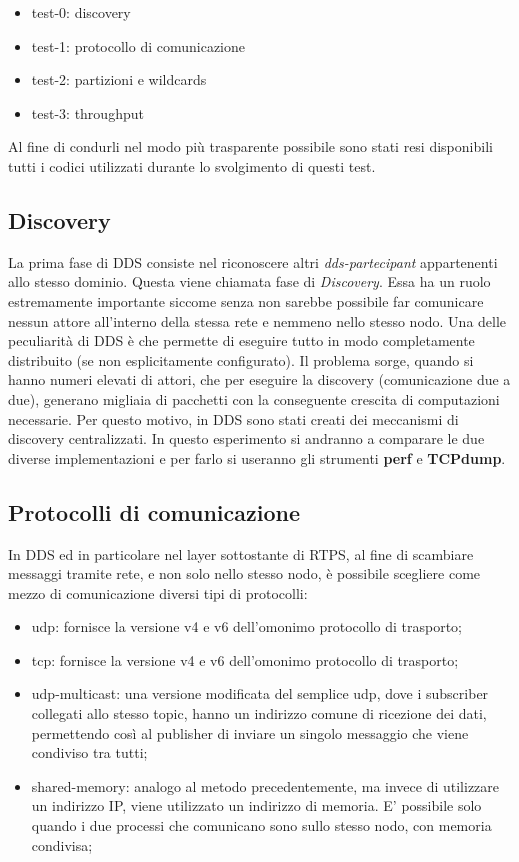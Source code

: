 \begin{itemize}
    \item test-0: discovery
    \item test-1: protocollo di comunicazione
    \item test-2: partizioni e wildcards
    \item test-3: throughput
\end{itemize}

Al fine di condurli nel modo più trasparente possibile sono stati resi disponibili~\cite{mygit} tutti i codici utilizzati durante lo svolgimento di questi test. %


\subsection{Discovery}
La prima fase di DDS consiste nel riconoscere altri \emph{dds-partecipant} appartenenti allo stesso dominio. Questa viene chiamata fase di \emph{ Discovery}. Essa ha un ruolo estremamente importante siccome senza non sarebbe possibile far comunicare nessun attore all'interno della stessa rete e nemmeno nello stesso nodo. Una delle peculiarità di DDS è che permette di eseguire tutto in modo completamente distribuito (se non esplicitamente configurato). Il problema sorge, quando si hanno numeri elevati di attori, che per eseguire la discovery (comunicazione due a due), generano migliaia di pacchetti con la conseguente crescita di  computazioni necessarie. %
Per questo motivo, in DDS sono stati creati dei meccanismi di discovery centralizzati. In questo esperimento si andranno a comparare le due diverse implementazioni e per farlo si useranno gli strumenti \textbf{perf} e \textbf{TCPdump}.

\subsection{Protocolli di comunicazione}
In DDS ed in particolare nel layer sottostante di RTPS, al fine di scambiare messaggi tramite rete, e non solo nello stesso nodo, è possibile scegliere come mezzo di comunicazione diversi tipi di protocolli:
\begin{itemize}
    \item udp: fornisce la versione v4 e v6 dell'omonimo protocollo di trasporto;
    \item tcp: fornisce la versione v4 e v6 dell'omonimo protocollo di trasporto;
    \item udp-multicast: una versione modificata del semplice udp, dove i subscriber collegati allo stesso topic, hanno un indirizzo comune di ricezione dei dati, permettendo così al publisher di inviare un singolo messaggio che viene condiviso tra tutti;
    \item shared-memory: analogo al metodo precedentemente, ma invece di utilizzare un indirizzo IP, viene utilizzato un indirizzo di memoria. E' possibile solo quando i due processi che comunicano sono sullo stesso nodo, con memoria condivisa;
\end{itemize}

